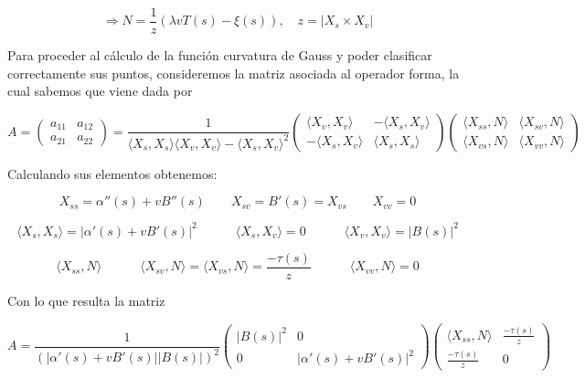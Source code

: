 \documentclass[fleqn]{article}
\begin{document}
    $$\Rightarrow N = \frac{1}{z} \left( \lambda v T(s) - \xi(s) \right), \quad z = |X_s \times X_v|$$

    Para proceder al cálculo de la función curvatura de Gauss y poder clasificar correctamente sus puntos, consideremos la matriz asociada al operador forma,
    la cual sabemos que viene dada por 

    \begin{equation*}
        A =
        \begin{pmatrix}
            a_{11} & a_{12} \\
            a_{21} & a_{22}
        \end{pmatrix}
        = \frac{1}{\langle X_s, X_s \rangle \langle X_v, X_v \rangle - \langle X_s, X_v \rangle ^2}
        \begin{pmatrix}
            \langle X_v, X_v \rangle & - \langle X_s, X_v \rangle \\
            -\langle X_s, X_v \rangle & \langle X_s, X_s \rangle
        \end{pmatrix}
        \begin{pmatrix}
            \langle X_{ss}, N \rangle & \langle X_{sv}, N \rangle \\
            \langle X_{vs}, N \rangle & \langle X_{vv}, N \rangle
        \end{pmatrix}
    \end{equation*}

    Calculando sus elementos obtenemos:

    $$X_{ss} = \alpha''(s) + vB''(s) \quad \quad X_{sv} = B'(s) = X_{vs} \quad \quad X_{vv} = 0$$

    $$\langle X_s, X_s \rangle = |\alpha'(s) + vB'(s)|^2 \quad \quad \quad \langle X_s, X_v \rangle = 0  \quad \quad \quad \langle X_v, X_v \rangle = |B(s)|^2$$

    $$\langle X_{ss}, N \rangle \quad \quad \quad \langle X_{sv}, N \rangle = \langle X_{vs}, N \rangle = \frac{-\tau(s)}{z} \quad \quad \quad \langle X_{vv}, N \rangle = 0$$

    Con lo que resulta la matriz

    $$
        A =
        \frac{1}{\left(|\alpha'(s) + vB'(s)||B(s)|\right)^2}
        \begin{pmatrix}
            |B(s)|^2 & 0 \\
            0 & |\alpha'(s) + vB'(s)|^2
        \end{pmatrix}
        \begin{pmatrix}
            \langle X_{ss}, N \rangle & \frac{-\tau(s)}{z} \\
            \frac{-\tau(s)}{z} & 0
        \end{pmatrix}
    $$
\end{document}
